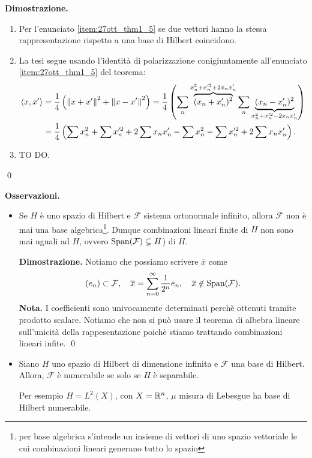 \documentclass[a4paper, 12pt]{report}
\begin{document}
\vs 

\textbf{Dimostrazione.}

\begin{enumerate}
\item Per l'enunciato \ref{item:27ott_thm1_5} se due vettori hanno la stessa rappresentazione rispetto a una base di Hilbert coincidono.

\item La tesi segue usando l'identità di polarizzazione conigiuntamente all'enunciato \ref{item:27ott_thm1_5} del teorema:
%
\begin{align*}
\left<x,x' \right> & = \frac{1}{4} \left( \left\lVert x + x' \right\rVert^2 + \left\lVert x - x' \right\rVert^2 \right)
= \frac{1}{4} \left( \sum_n \overbrace{(x_n + x_n')^2}^{x_n^2 + x_n'^2 + 2x_n x_n'}  \sum_n \underbrace{(x_n - x_n')^2}_{x_n^2 + x_n'^2 - 2 x_n x_n'}  \right) \\
& = \frac{1}{4} \left( \sum x_n^2 + \sum x_n'^2 + 2 \sum x_n x_n' - \sum x_n^2 - \sum x_n'^2 + 2 \sum x_n x_n' \right).
\end{align*}

\item TO DO.

\end{enumerate}
\qed

\textbf{Osservazioni.}
\begin{itemize}
\item Se $H$ è uno spazio di Hilbert e $\mathcal{F}$ sistema ortonormale infinito, allora $\mathcal{F}$ non è mai una base algebrica\footnote{per base algebrica s'intende un insieme di vettori di uno spazio vettoriale le cui combinazioni lineari generano tutto lo spazio}. Dunque combinazioni lineari finite di $H$ non sono mai uguali ad $H$, ovvero $\operatorname{Span}(\mathcal{F}) \subsetneq H $) di $H$.

\textbf{Dimostrazione.} 
Notiamo che possiamo scrivere $\overline{x}$ come
%
$$
(e_n) \subset \mathcal{F}, \quad  \overline{x} = \sum_{n = 0}^\infty \frac{1}{2^n} e_n, \quad  \overline{x} \notin \operatorname{Span}(\mathcal{F}).
$$
%
\textbf{Nota.} I coefficienti sono univocamente determinati perchè ottenuti tramite prodotto scalare. Notiamo che non si può usare il teorema di albebra lineare sull'unicità della rappesentazione poichè stiamo trattando combinazioni lineari infite.
\qed

\item Siano $H$ uno spazio di Hilbert di dimensione infinita e $\mathcal{F}$ una base di Hilbert. Allora, $\mathcal{F}$ è numerabile se solo se $H$ è separabile.

Per esempio $H = L^2(X)$, con $X = \mathbb R^n$, $\mu $ misura di Lebesgue ha base di Hilbert numerabile.
\end{itemize}
\end{document}
